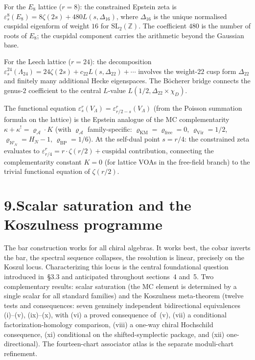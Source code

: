 \documentclass[11pt,reqno]{amsart}
\theoremstyle{definition}
\theoremstyle{remark}
\providecommand{\cA}{\mathcal{A}}
\providecommand{\cW}{\mathcal{W}}
\providecommand{\bZ}{\mathbb{Z}}
\numberwithin{equation}{section}
\begin{document}
For the $E_8$ lattice ($r = 8$): the constrained Epstein
zeta is $\varepsilon^8_s(E_8) = 8\zeta(2s) + 480 L(s, \Delta_{16})$,
where $\Delta_{16}$ is the unique normalised cuspidal eigenform
of weight $16$ for $\mathrm{SL}_2(\bZ)$. The coefficient $480$
is the number of roots of $E_8$; the cuspidal component carries
the arithmetic beyond the Gaussian base.

For the Leech lattice ($r = 24$): the decomposition
$\varepsilon^{24}_s(\Lambda_{24}) = 24\zeta(2s)
+ c_{22}L(s, \Delta_{22}) + \cdots$
involves the weight-$22$ cusp form $\Delta_{22}$ and finitely
many additional Hecke eigenspaces. The B\"ocherer bridge
connects the genus-$2$ coefficient to the central $L$-value
$L(1/2, \Delta_{22} \times \chi_D)$.

The functional equation
$\varepsilon^r_s(V_\Lambda) = \varepsilon^r_{r/2-s}(V_\Lambda)$
(from the Poisson summation formula on the lattice) is the
Epstein analogue of the MC complementarity
$\kappa + \kappa^! = \varrho_\cA \cdot K$ (with $\varrho_\cA$
family-specific: $\varrho_{\mathrm{KM}} = \varrho_{\mathrm{free}} = 0$,
$\varrho_{\mathrm{Vir}} = 1/2$, $\varrho_{\cW_N} = H_N - 1$,
$\varrho_{\mathrm{BP}} = 1/6$).
At the self-dual point $s = r/4$: the constrained zeta
evaluates to $\varepsilon^r_{r/4} = r \cdot \zeta(r/2)
+ \text{cuspidal contribution}$, connecting the complementarity
constant $K = 0$ (for lattice VOAs in the free-field branch)
to the trivial functional equation of $\zeta(r/2)$.



\section*{9.\quad Scalar saturation and the Koszulness programme}

The bar construction works for all chiral algebras. It works best,
the cobar inverts the bar, the spectral sequence collapses, the
resolution is linear, precisely on the Koszul locus. Characterizing
this locus is the central foundational question introduced in~\S3.3
and anticipated throughout sections~4 and~5. Two complementary
results: scalar saturation (the MC element is determined by a single
scalar for all standard families) and the Koszulness meta-theorem
(twelve tests and consequences: seven genuinely independent
bidirectional equivalences \textup{(i)--(v), (ix)--(x)}, with
\textup{(vi)} a proved consequence of~\textup{(v)},
\textup{(vii)} a conditional factorization-homology comparison,
\textup{(viii)} a one-way chiral Hochschild consequence,
\textup{(xi)} conditional on the shifted-symplectic package, and
\textup{(xii)} one-directional). The fourteen-chart associator atlas
is the separate moduli-chart refinement.
\end{document}
